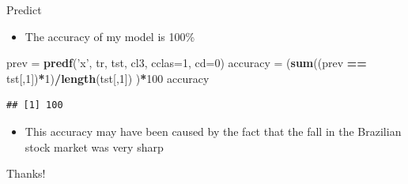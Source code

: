 \documentclass[
  10pt,
  ignorenonframetext,
]{beamer}
\newenvironment{Shaded}{\begin{snugshade}}{\end{snugshade}}
\newcommand{\DataTypeTok}[1]{\textcolor[rgb]{0.13,0.29,0.53}{#1}}
\newcommand{\DecValTok}[1]{\textcolor[rgb]{0.00,0.00,0.81}{#1}}
\newcommand{\KeywordTok}[1]{\textcolor[rgb]{0.13,0.29,0.53}{\textbf{#1}}}
\newcommand{\NormalTok}[1]{#1}
\newcommand{\OperatorTok}[1]{\textcolor[rgb]{0.81,0.36,0.00}{\textbf{#1}}}
\newcommand{\StringTok}[1]{\textcolor[rgb]{0.31,0.60,0.02}{#1}}
\providecommand{\tightlist}{%
  \setlength{\itemsep}{0pt}\setlength{\parskip}{0pt}}
\begin{document}
\begin{frame}[fragile]{Predict}
\protect\hypertarget{predict-11}{}

\begin{itemize}
\tightlist
\item
  The accuracy of my model is 100\%
\end{itemize}

\begin{Shaded}
\begin{Highlighting}[]
\NormalTok{prev =}\StringTok{ }\KeywordTok{predf}\NormalTok{(}\StringTok{'x'}\NormalTok{, tr, tst, cl3, }\DataTypeTok{cclas=}\DecValTok{1}\NormalTok{, }\DataTypeTok{cd=}\DecValTok{0}\NormalTok{)}
\NormalTok{accuracy =}\StringTok{ }\NormalTok{(}\KeywordTok{sum}\NormalTok{((prev }\OperatorTok{==}\StringTok{ }\NormalTok{tst[,}\DecValTok{1}\NormalTok{])}\OperatorTok{*}\DecValTok{1}\NormalTok{)}\OperatorTok{/}\KeywordTok{length}\NormalTok{(tst[,}\DecValTok{1}\NormalTok{]) )}\OperatorTok{*}\DecValTok{100}
\NormalTok{accuracy}
\end{Highlighting}
\end{Shaded}

\begin{verbatim}
## [1] 100
\end{verbatim}

\begin{itemize}
\tightlist
\item
  This accuracy may have been caused by the fact that the fall in the
  Brazilian stock market was very sharp
\end{itemize}

\end{frame}

\begin{frame}{}
\protect\hypertarget{section}{}

\begin{center}
  \huge{Thanks!}
\end{center}

\end{frame}
\end{document}
